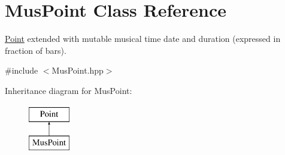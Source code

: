 \hypertarget{classMusPoint}{}\section{Mus\+Point Class Reference}
\label{classMusPoint}


\mbox{\hyperlink{classPoint}{Point}} extended with mutable musical time date and duration (expressed in fraction of bars).  




{\ttfamily \#include $<$Mus\+Point.\+hpp$>$}

Inheritance diagram for Mus\+Point\+:\begin{figure}[H]
\begin{center}
\leavevmode
\includegraphics[height=2.000000cm]{classMusPoint}
\end{center}
\end{figure}
